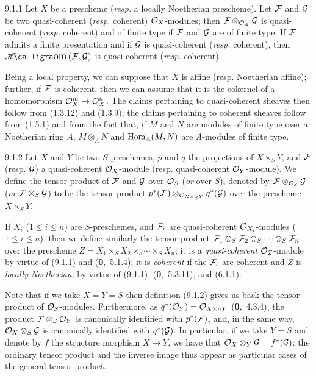 \documentclass[../main.tex]{subfiles}
\begin{document}
\begin{env}[Proposition]{9.1.1}
    Let $X$ be a prescheme (\emph{resp.} a locally Noetherian prescheme).
    Let $\mathcal{F}$ and $\mathcal{G}$ be two quasi-coherent (\emph{resp.} coherent) $\mathcal{O}_X$-modules; then $\mathcal{F}\otimes_{\mathcal{O}_X}\mathcal{G}$ is quasi-coherent (\emph{resp.} coherent) and of finite type if $\mathcal{F}$ and $\mathcal{G}$ are of finite type.
    If $\mathcal{F}$ admits a finite presentation and if $\mathcal{G}$ is quasi-coherent (\emph{resp.} coherent), then $\sheafHom(\sheaf{F},\sheaf{G})$ is quasi-coherent (\emph{resp.} coherent).
\end{env}

Being a local property, we can suppose that $X$ is affine (resp. Noetherian affine); further, if $\mathcal{F}$ is coherent, then we can assume that it is the cokernel of a homomorphism $\mathcal{O}_X^m\to\mathcal{O}_X^n$.
The claims pertaining to quasi-coherent sheaves then follow from (1.3.12) and (1.3.9); the claims pertaining to coherent sheaves follow from (1.5.1) and from the fact that, if $M$ and $N$ are modules of finite type over a Noetherian ring $A$, $M\otimes_A N$ and $\operatorname{Hom}_A(M,N)$ are $A$-modules of finite type.

\begin{env}[Definition]{9.1.2}
    Let $X$ and $Y$ be two $S$-preschemes, $p$ and $q$ the projections of $X\times_S Y$, and $\mathcal{F}$ (resp. $\mathcal{G}$) a quasi-coherent $\mathcal{O}_X$-module (resp. quasi-coherent $\mathcal{O}_Y$-module).
    We define the tensor product of $\mathcal{F}$ and $\mathcal{G}$ over $\mathcal{O}_S$ (\emph{or} over $S$), denoted by $\mathcal{F}\otimes_{\mathcal{O}_S}\mathcal{G}$ (\emph{or} $\mathcal{F}\otimes_S\mathcal{G}$) to be the tensor product $p^*(\mathcal{F})\otimes_{\mathcal{O}_{X\times_S Y}}q^*(\mathcal{G})$ over the prescheme $X\times_S Y$.
\end{env}


If $X_i$ ($1\leqslant i\leqslant n$) are $S$-preschemes, and $\mathcal{F}_i$ are quasi-coherent $\mathcal{O}_{X_i}$-modules ($1\leqslant i\leqslant n$), then we define similarly the tensor product $\mathcal{F}_1\otimes_S\mathcal{F}_2\otimes_S\cdots\otimes_S\mathcal{F}_n$ over the prescheme $Z=X_1\times_S X_2\times_s\cdots\times_S X_n$; it is a \emph{quasi-coherent} $\mathcal{O}_Z$-module by virtue of (9.1.1) and (\textbf{0},~5.1.4); it is \emph{coherent} if the $\mathcal{F}_i$ are coherent and $Z$ is \emph{locally Noetherian}, by virtue of (9.1.1), (\textbf{0},~5.3.11), and (6.1.1).

Note that if we take $X=Y=S$ then definition (9.1.2) gives us back the tensor product of $\mathcal{O}_S$-modules.
Furthermore, as $q^*(\mathcal{O}_Y)=\mathcal{O}_{X\times_S Y}$ (\textbf{0},~4.3.4), the product $\mathcal{F}\otimes_S\mathcal{O}_Y$ is canonically identified with $p^*(\mathcal{F})$, and, in the same way, $\mathcal{O}_X\otimes_S\mathcal{G}$ is canonically identified with $q^*(\mathcal{G})$.
In particular, if we take $Y=S$ and denote by $f$ the structure morphism $X\to Y$, we have that $\mathcal{O}_X\otimes_Y\mathcal{G}=f^*(\mathcal{G})$: the ordinary tensor product and the inverse image thus appear as particular cases of the general tensor product.
\end{document}
